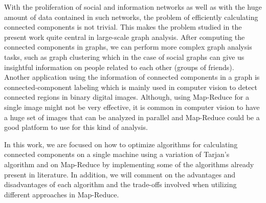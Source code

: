 With the proliferation of social and information networks as well as with the huge amount of data contained in such networks, the problem of efficiently calculating connected components is not trivial. This makes the problem studied in the present work quite central in large-scale graph analysis. After computing the connected components in graphs, we can perform more complex graph analysis tasks, such as graph clustering which in the case of social graphs can give us insightful information on people related to each other (\eg groups of friends). Another application using the information of connected components in a graph is connected-component labeling which is mainly used in computer vision to detect connected regions in binary digital images. Although, using Map-Reduce for a single image might not be very effective, it is common in computer vision to have a huge set of images that can be analyzed in parallel and Map-Reduce could be a good platform to use for this kind of analysis.

In this work, we are focused on how to optimize algorithms for calculating connected components on a single machine using a variation of Tarjan's algorithm and on Map-Reduce by implementing some of the algorithms already present in literature. In addition, we will comment on the advantages and disadvantages of each algorithm and the trade-offs involved when utilizing different approaches in Map-Reduce.

